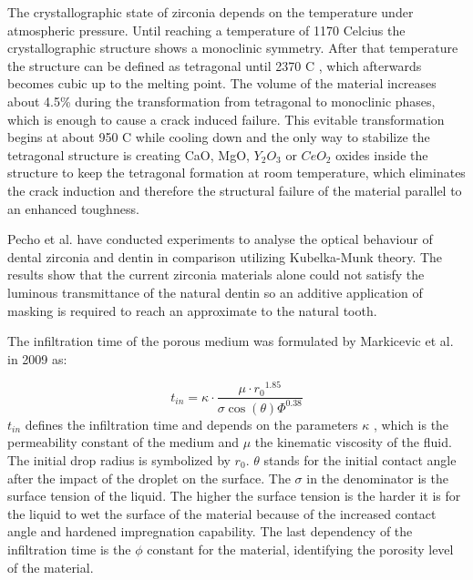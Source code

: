 The crystallographic state of zirconia depends on the temperature under atmospheric pressure. Until reaching a temperature of {1170\textdegree} Celcius the crystallographic structure shows a monoclinic symmetry. After that temperature the structure can be defined as tetragonal until {2370\textdegree} C , which afterwards becomes cubic up to the melting point. The volume of the material increases about 4.5\% during the transformation from tetragonal to monoclinic phases, which is enough to cause a crack induced failure. This evitable transformation begins at about {950\textdegree} C while cooling down and the only way to stabilize the tetragonal structure is creating CaO, MgO, $Y_{2}O_{3}$ or $CeO_{2}$ oxides inside the structure to keep the tetragonal formation  at room temperature, which eliminates the crack induction and therefore the structural failure of the material parallel to an enhanced toughness. \citep{denry2008state}

Pecho et al. have conducted experiments to analyse the optical behaviour of dental zirconia and dentin in comparison utilizing Kubelka-Munk theory. The results show that the current zirconia materials alone could not satisfy the luminous transmittance of the natural dentin so an additive application of masking is required to reach an approximate to the natural tooth.\citep{pecho2015optical}

The infiltration time of the porous medium was formulated by Markicevic et al. in 2009 as:

\begin{equation}
t_{in}=\kappa \cdotp {\frac{\mu \cdotp r{_0}^{1.85}}{\sigma \cos({\theta})\varPhi^{0.38}}}
\end{equation}
\newline
$t_{in}$ defines the infiltration time and depends on the parameters $\kappa$ , which is the permeability constant of the medium and $\mu$ the kinematic viscosity of the fluid. The initial drop radius is symbolized by $r_{0}$. $\theta$ stands for the initial contact angle after the impact of the droplet on the surface. The $\sigma$ in the denominator is the surface tension of the liquid. The higher the surface tension is the harder it is for the liquid to wet the surface of the material because of the increased contact angle and hardened impregnation capability. The last dependency of the infiltration time is  the $\phi$ constant for the material, identifying the porosity level of the material. \citep{markicevic2009infiltration}

